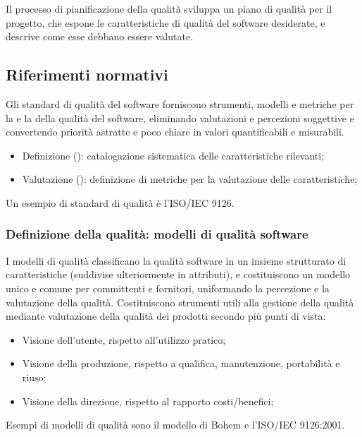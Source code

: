 Il processo di pianificazione della qualità sviluppa un piano di qualità per il
progetto, che espone le caratteristiche di qualità del software desiderate, e
descrive come esse debbano essere valutate.

\subsection{Riferimenti normativi}

Gli standard di qualità del software forniscono strumenti, modelli e metriche
per la  e la  della qualità del
software, eliminando valutazioni e percezioni soggettive e convertendo priorità
astratte e poco chiare in valori quantificabili e misurabili.

\begin{itemize}
  \item Definizione (): catalogazione sistematica
    delle caratteristiche rilevanti;
  \item Valutazione (): definizione di metriche per la
    valutazione delle caratteristiche;
\end{itemize}

Un esempio di standard di qualità è l'ISO/IEC 9126.

\subsubsection{Definizione della qualità: modelli di qualità software}

I modelli di qualità classificano la qualità software in un insieme strutturato
di caratteristiche (suddivise ulteriormente in attributi), e costituiscono un
modello unico e comune per committenti e fornitori, uniformando la percezione e
la valutazione della qualità. Costituiscono strumenti utili alla gestione della
qualità mediante valutazione della qualità dei prodotti secondo più punti di
vista:

\begin{itemize}
  \item Visione dell'utente, rispetto all'utilizzo pratico;
  \item Visione della produzione, rispetto a qualifica, manutenzione,
    portabilità e riuso;
  \item Visione della direzione, rispetto al rapporto costi/benefici;
\end{itemize}

Esempi di modelli di qualità sono il modello di Bohem e l'ISO/IEC 9126:2001.

